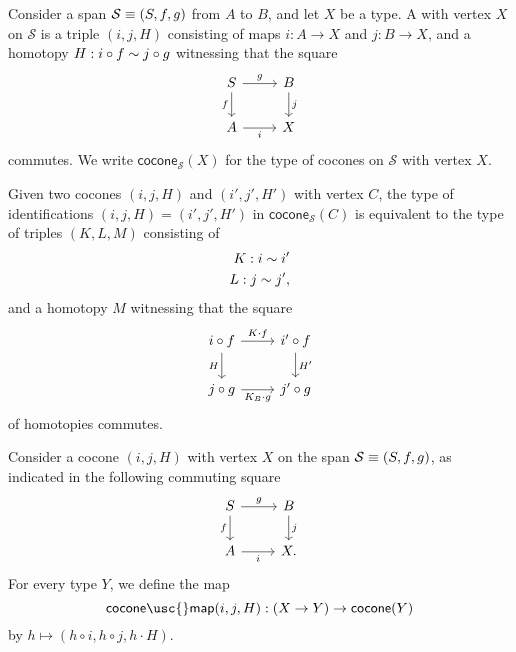 \begin{defn}
Consider a span $\mathcal{S}\equiv (S,f,g)$ from $A$ to $B$, and let $X$ be a type.
A  with vertex $X$ on $\mathcal{S}$ is a triple $(i,j,H)$ consisting of maps $i:A\to X$ and $j:B\to X$, and a homotopy $H:i\circ f\sim j\circ g$ witnessing that the square
\begin{equation*}
\begin{tikzcd}
S \arrow[r,"g"] \arrow[d,swap,"f"] & B \arrow[d,"j"] \\
A \arrow[r,swap,"i"] & X
\end{tikzcd}
\end{equation*}
commutes.
We write $\mathsf{cocone}_{\mathcal{S}}(X)$ for the type of cocones on $\mathcal{S}$ with vertex $X$.
\end{defn}

\begin{rmk}\label{rmk:htpy-cocone}
  Given two cocones $(i,j,H)$ and $(i',j',H')$ with vertex $C$, the type of identifications $(i,j,H)=(i',j',H')$ in $\mathsf{cocone}_{\mathcal{S}}(C)$ is equivalent to the type of triples $(K,L,M)$ consisting of
  \begin{align*}
    K : i\sim i' \\
    L : j\sim j',
  \end{align*}
  and a homotopy $M$ witnessing that the square
  \begin{equation*}
    \begin{tikzcd}
      i\circ f \arrow[d,swap,"H"] \arrow[r,"K\cdot f"] & i' \circ f \arrow[d,"{H'}"] \\
      j\circ g \arrow[r,swap,"K_B\cdot g"] & j'\circ g
    \end{tikzcd}
  \end{equation*}
  of homotopies commutes.
\end{rmk}

\begin{defn}
Consider a cocone $(i,j,H)$ with vertex $X$ on the span $\mathcal{S}\equiv (S,f,g)$, as indicated in the following commuting square
\begin{equation*}
\begin{tikzcd}
S \arrow[r,"g"] \arrow[d,swap,"f"] & B \arrow[d,"j"] \\
A \arrow[r,swap,"i"] & X.
\end{tikzcd}
\end{equation*}
For every type $Y$, we define the map
\begin{equation*}
\mathsf{cocone\usc{}map}(i,j,H):(X\to Y)\to \mathsf{cocone}(Y)
\end{equation*}
by $h\mapsto (h\circ i,h\circ j,h\cdot H)$.
\end{defn}

